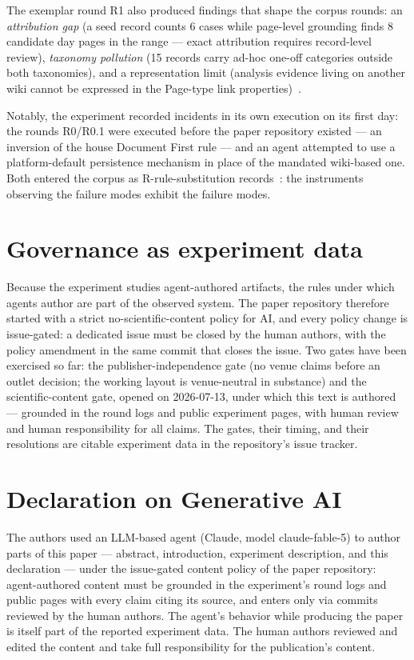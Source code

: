 \documentclass[
]{ceurart}
\begin{document}
The exemplar round R1 also produced findings that shape the corpus rounds:
an \emph{attribution gap} (a seed record counts 6 cases while page-level
grounding finds 8 candidate day pages in the range --- exact attribution
requires record-level review), \emph{taxonomy pollution} (15 records carry
ad-hoc one-off categories outside both taxonomies), and a representation
limit (analysis evidence living on another wiki cannot be expressed in the
Page-type link properties)~\cite{dmaicbootstrap}.

Notably, the experiment recorded incidents in its own execution on its
first day: the rounds R0/R0.1 were executed before the paper repository
existed --- an inversion of the house Document First rule --- and an agent
attempted to use a platform-default persistence mechanism in place of the
mandated wiki-based one. Both entered the corpus as R-rule-substitution
records~\cite{dmaicbootstrap}: the instruments observing the failure modes
exhibit the failure modes.

\section{Governance as experiment data}\label{sec:governance}
Because the experiment studies agent-authored artifacts, the rules under
which agents author are part of the observed system. The paper repository
therefore started with a strict no-scientific-content policy for AI, and
every policy change is issue-gated: a dedicated issue must be closed by
the human authors, with the policy amendment in the same commit that
closes the issue. Two gates have been exercised so far: the
publisher-independence gate (no venue claims before an outlet decision;
the working layout is venue-neutral in substance) and the
scientific-content gate, opened on 2026-07-13, under which this text is
authored --- grounded in the round logs and public experiment pages, with
human review and human responsibility for all claims. The gates, their
timing, and their resolutions are citable experiment data in the
repository's issue tracker.

\section*{Declaration on Generative AI}
The authors used an LLM-based agent (Claude, model claude-fable-5) to
author parts of this paper --- abstract, introduction, experiment
description, and this declaration --- under the issue-gated content policy
of the paper repository: agent-authored content must be grounded in the
experiment's round logs and public pages with every claim citing its
source, and enters only via commits reviewed by the human authors. The
agent's behavior while producing the paper is itself part of the reported
experiment data. The human authors reviewed and edited the content and
take full responsibility for the publication's content.


\end{document}

